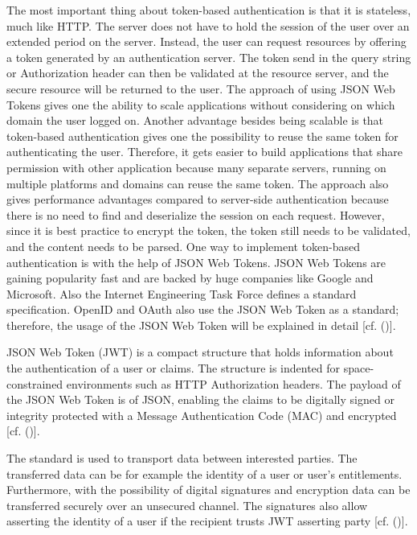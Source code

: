 The most important thing about token-based authentication is that it is stateless, much like HTTP. The server does not have to hold the session of the user over an extended period on the server. Instead, the user can request resources by offering a token generated by an authentication server. The token send in the query string or Authorization header can then be validated at the resource server, and the secure resource will be returned to the user. The approach of using JSON Web Tokens gives one the ability to scale applications without considering on which domain the user logged on. Another advantage besides being scalable is that token-based authentication gives one the possibility to reuse the same token for authenticating the user. Therefore, it gets easier to build applications that share permission with other application because many separate servers, running on multiple platforms and domains can reuse the same token. The approach also gives performance advantages compared to server-side authentication because there is no need to find and deserialize the session on each request. However, since it is best practice to encrypt the token, the token still needs to be validated, and the content needs to be parsed. One way to implement token-based authentication is with the help of JSON Web Tokens. JSON Web Tokens are gaining popularity fast and are backed by huge companies like Google and Microsoft. Also the Internet Engineering Task Force defines a standard specification. OpenID and OAuth also use the JSON Web Token as a standard; therefore, the usage of the JSON Web Token will be explained in detail [cf. (\cite{Tkalec:2015})].


JSON Web Token (JWT) is a compact structure that holds information about the authentication of a user or claims. The structure is indented for space-constrained environments such as HTTP Authorization headers. The payload of the JSON Web Token is of JSON, enabling the claims to be digitally signed or integrity protected with a Message Authentication Code (MAC) and encrypted [cf. (\cite{JWT:IETF:Jones:2015})].

The standard is used to transport data between interested parties. The transferred data can be for example the identity of a user or user’s entitlements. Furthermore, with the possibility of digital signatures and encryption data can be transferred securely over an unsecured channel. The signatures also allow asserting the identity of a user if the recipient trusts JWT asserting party [cf. (\cite{Siriwardena:JWTJWSJWE:2016})].

